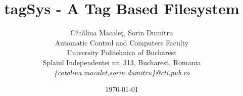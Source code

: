 \documentclass[12pt]{article}
\title{tagSys - A Tag Based Filesystem}
\author{C\u{a}t\u{a}lina Macale\c{t}, Sorin Dumitru\\
Automatic Control and Computers Faculty\\
University Politehnica of Bucharest\\
Splaiul Independenței nr. 313, Bucharest, Romania \\
\emph{\{catalina.macalet,sorin.dumitru\}@cti.pub.ro}}
\date{\today}
\begin{document}
\nocite{*}
\maketitle


\newpage


%

\end{document}
